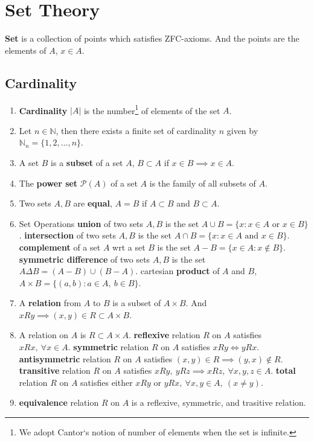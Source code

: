 \chapter{Set Theory}
	\textbf{Set} is a collection of points which satisfies ZFC-axioms. And the points are the elements of $A$, $x \in A$.

\section{Cardinality}
\begin{enumerate}
	\item \textbf{Cardinality} $|A|$ is the number\footnote{We adopt Cantor`s notion of number of elements when the set is infinite.} of elements of the set $A$.
	\item Let $n \in \mathbb{N}$, then there exists a finite set of cardinality $n$ given by $\mathbb{N}_n = \{ 1,2,\dots, n \}$.
	\item A set $B$ is a \textbf{subset} of a set $A$, $B \subset A$ if $x \in B \implies x \in A$.
	\item The \textbf{power set} $\mathcal{P}(A)$ of a set $A$ is the family of all subsets of $A$.
	\item Two sets $A,B$ are \textbf{equal}, $A = B$ if $A \subset B$ and $B \subset A$.
	\item Set Operations
		\subitem \textbf{union} of two sets $A,B$ is the set $A \cup B = \{ x : x \in A \text{ or } x \in B\}$.
		\subitem \textbf{intersection} of two sets $A,B$ is the set $A \cap B = \{ x : x \in A \text{ and } x \in B\}$.
		\subitem \textbf{complement} of a set $A$ wrt a set $B$ is the set $A-B = \{ x \in A : x \notin B\}$.
		\subitem \textbf{symmetric difference} of two sets $A,B$ is the set $A \Delta B = (A-B) \cup (B-A)$.
		\subitem cartesian \textbf{product} of $A$ and $B$, $A \times B = \{ (a,b) : a \in A,\ b \in B\}$.
	\item A \textbf{relation} from $A$ to $B$ is a subset of $A \times B$.
	And $xRy \implies (x,y) \in R \subset A \times B$.
	\item A relation on $A$ is $R \subset A \times A$.
		\subitem \textbf{reflexive} relation $R$ on $A$ satisfies $xRx,\ \forall x \in A$.
		\subitem \textbf{symmetric} relation $R$ on $A$ satisfies $xRy \iff yRx$.
		\subitem \textbf{antisymmetric} relation $R$ on $A$ satisfies $(x,y) \in R \implies (y,x) \notin R$.
		\subitem \textbf{transitive} relation $R$ on $A$ satisfies $xRy,\ yRz \implies xRz,\ \forall x,y,z \in A$.
		\subitem \textbf{total} relation $R$ on $A$ satisfies either $xRy \text{ or } yRx,\ \forall x,y \in A,\ (x \ne y)$.  \item \textbf{equivalence} relation $R$ on $A$ is a reflexive, symmetric, and trasitive relation.

\end{enumerate}
